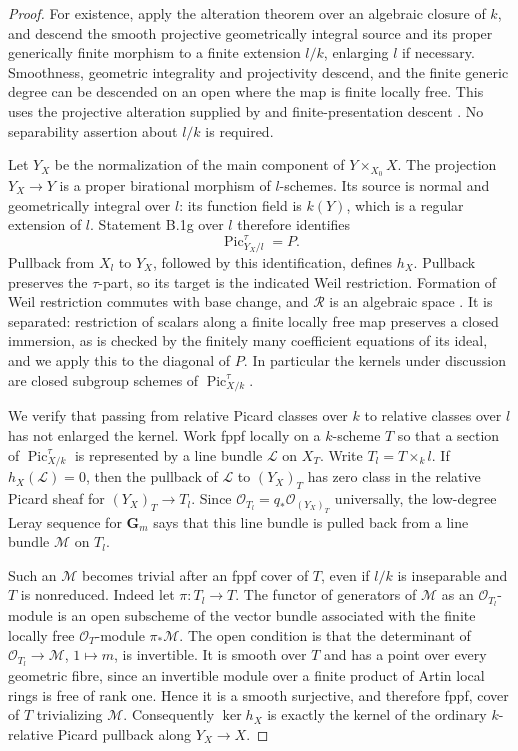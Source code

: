 \begin{proof}
For existence, apply the alteration theorem over an algebraic
closure of $k$, and descend the smooth projective geometrically
integral source and its proper generically finite morphism to a
finite extension $l/k$, enlarging $l$ if necessary.  Smoothness,
geometric integrality and projectivity descend, and the finite
generic degree can be descended on an open where the map is finite
locally free.  This uses the projective alteration supplied by
\cite[Corollary 5.15, with the projectivity assertion in
Theorem 5.9 and Proposition 5.11]{deJong1997} and finite-presentation
descent \cite[Tag 01ZM]{StacksB}.  No separability assertion about
$l/k$ is required.

Let $Y_X$ be the normalization of the main component of
$Y\times_{X_0}X$.  The projection $Y_X\to Y$ is a proper
birational morphism of $l$-schemes.  Its source is normal and
geometrically integral over $l$: its function field is $k(Y)$,
which is a regular extension of $l$.  Statement B.1g over $l$
therefore identifies
\[
 \operatorname{Pic}^{\tau}_{Y_X/l}=P.
\]
Pullback from $X_l$ to $Y_X$, followed by this identification,
defines $h_X$.  Pullback preserves the $\tau$-part, so its target
is the indicated Weil restriction.  Formation of Weil restriction
commutes with base change, and $\mathcal R$ is an algebraic space
\cite[Lemma 97.11.2 and Proposition 97.11.5, Tag 05Y8]{StacksB}.
It is separated: restriction of scalars along a finite locally
free map preserves a closed immersion, as is checked by the
finitely many coefficient equations of its ideal, and we apply
this to the diagonal of $P$.  In particular the kernels under
discussion are closed subgroup schemes of
$\operatorname{Pic}^{\tau}_{X/k}$.

We verify that passing from relative Picard classes over $k$ to
relative classes over $l$ has not enlarged the kernel.  Work fppf
locally on a $k$-scheme $T$ so that a section of
$\operatorname{Pic}^{\tau}_{X/k}$ is represented by a line bundle
$\mathcal L$ on $X_T$.  Write $T_l=T\times_k l$.
If $h_X(\mathcal L)=0$, then the pullback of $\mathcal L$ to
$(Y_X)_T$ has zero class in the relative Picard sheaf for
$(Y_X)_T\to T_l$.  Since
$\mathcal O_{T_l}=q_*\mathcal O_{(Y_X)_T}$ universally, the
low-degree Leray sequence for $\mathbf G_m$ says that this line
bundle is pulled back from a line bundle $\mathcal M$ on $T_l$.

Such an $\mathcal M$ becomes trivial after an fppf cover of $T$,
even if $l/k$ is inseparable and $T$ is nonreduced.  Indeed let
$\pi:T_l\to T$.  The functor of generators of $\mathcal M$ as
an $\mathcal O_{T_l}$-module is an open subscheme of the vector
bundle associated with the finite locally free
$\mathcal O_T$-module $\pi_*\mathcal M$.
The open condition is that the determinant of
$\mathcal O_{T_l}\to\mathcal M$, $1\mapsto m$, is invertible.
It is smooth over $T$ and has a point over every geometric
fibre, since an invertible module over a finite product of Artin
local rings is free of rank one.  Hence it is a smooth surjective,
and therefore fppf, cover of $T$ trivializing $\mathcal M$.
Consequently $\ker h_X$ is exactly the kernel of the ordinary
$k$-relative Picard pullback along $Y_X\to X$.


\end{proof}
